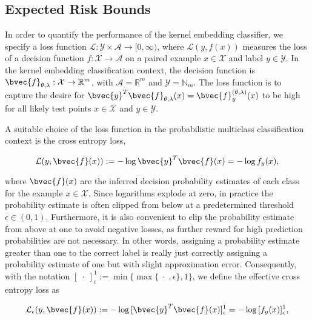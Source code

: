 \documentclass{article}
\numberwithin{equation}{section}
\numberwithin{table}{section}
\numberwithin{algorithm}{section}
\begin{document}
	\subsection{Expected Risk Bounds}
	\label{app:expected_risk_bounds}
	
		In order to quantify the performance of the kernel embedding classifier, we specify a loss function $\mathcal{L} : \mathcal{Y} \times \mathcal{A} \to [0, \infty)$, where $\mathcal{L}(y, f(x))$ measures the loss of a decision function $f : \mathcal{X} \to \mathcal{A}$ on a paired example $x \in \mathcal{X}$ and label $y \in \mathcal{Y}$. In the kernel embedding classification context, the decision function is $\bvec{f}_{\theta, \lambda} : \mathcal{X} \to \mathbb{R}^{m}$, with $\mathcal{A} = \mathbb{R}^{m}$ and $\mathcal{Y} = \mathbb{N}_{m}$. The loss function is to capture the desire for $\bvec{y}^{T} \bvec{f}_{\theta, \lambda}(x) = \bvec{f}_{y}^{(\theta, \lambda)}(x)$ to be high for all likely test points $x \in \mathcal{X}$ and $y \in \mathcal{Y}$.
		
		A suitable choice of the loss function in the probabilistic multiclass classification context is the cross entropy loss,
		
		\begin{equation}
			\mathcal{L}(y, \bvec{f}(x)) := - \log{\bvec{y}^{T} \bvec{f}(x)} = - \log{f_{y}(x)},
		\end{equation}
		
		where $\bvec{f}(x)$ are the inferred decision probability estimates of each class for the example $x \in \mathcal{X}$. Since logarithms explode at zero, in practice the probability estimate is often clipped from below at a predetermined threshold $\epsilon \in (0, 1)$. Furthermore, it is also convenient to clip the probability estimate from above at one to avoid negative losses, as further reward for high prediction probabilities are not necessary. In other words, assigning a probability estimate greater than one to the correct label is really just correctly assigning a probability estimate of one but with slight approximation error. Consequently, with the notation $[\;\cdot\;]_{\epsilon}^{1} := \min\{\max\{\;\cdot\;, \epsilon\}, 1\}$, we define the effective cross entropy loss as
		
		\begin{equation}
			\mathcal{L}_{\epsilon}(y, \bvec{f}(x)) := - \log{ [\bvec{y}^{T} \bvec{f}(x)]_{\epsilon}^{1} } = - \log{ [f_{y}(x)]_{\epsilon}^{1} },
		\label{eq:cross_entropy_loss}
		\end{equation}
		
\end{document}
